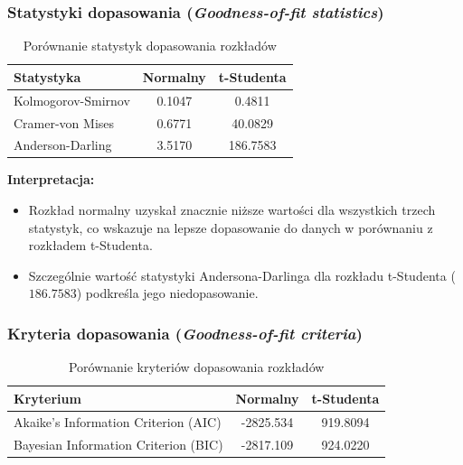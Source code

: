 \documentclass[a4paper,11pt]{article}
\begin{document}
\subsubsection*{Statystyki dopasowania (\textit{Goodness-of-fit statistics})}

\begin{table}[h!]
\centering
\begin{tabular}{|l|c|c|}
\hline
\textbf{Statystyka}            & \textbf{Normalny} & \textbf{t-Studenta} \\ \hline
Kolmogorov-Smirnov             & 0.1047            & 0.4811             \\ \hline
Cramer-von Mises               & 0.6771            & 40.0829            \\ \hline
Anderson-Darling               & 3.5170            & 186.7583           \\ \hline
\end{tabular}
\caption{Porównanie statystyk dopasowania rozkładów}
\end{table}

\textbf{Interpretacja:}
\begin{itemize}
    \item Rozkład normalny uzyskał znacznie niższe wartości dla wszystkich trzech statystyk, co wskazuje na lepsze dopasowanie do danych w porównaniu z rozkładem t-Studenta.
    \item Szczególnie wartość statystyki Andersona-Darlinga dla rozkładu t-Studenta ($186.7583$) podkreśla jego niedopasowanie.
\end{itemize}

\subsubsection*{Kryteria dopasowania (\textit{Goodness-of-fit criteria})}

\begin{table}[h!]
\centering
\begin{tabular}{|l|c|c|}
\hline
\textbf{Kryterium}                     & \textbf{Normalny} & \textbf{t-Studenta} \\ \hline
Akaike's Information Criterion (AIC)  & -2825.534         & 919.8094            \\ \hline
Bayesian Information Criterion (BIC)  & -2817.109         & 924.0220            \\ \hline
\end{tabular}
\caption{Porównanie kryteriów dopasowania rozkładów}
\end{table}
\end{document}
